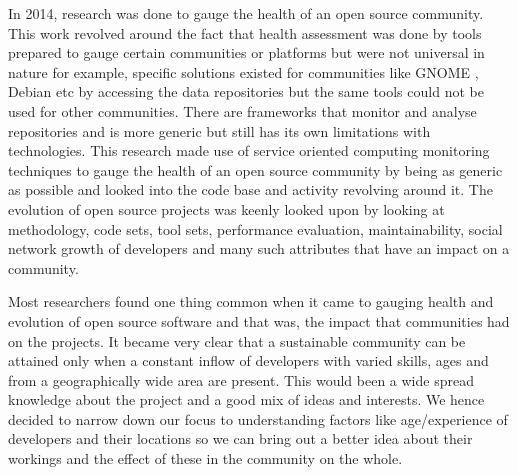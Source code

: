 \documentclass[seploa]{beavtex}
\begin{document}
In 2014, research was done to gauge the health of an open source community. This work revolved around the fact that health assessment was done by tools prepared to gauge certain communities or platforms but were not universal in nature for example, specific solutions existed for communities like GNOME \cite{gno}, Debian\cite{ver2011} etc by accessing the data repositories but the same tools could not be used for other communities\cite{gno}. There are frameworks that monitor and analyse repositories and is more generic but still has its own limitations with technologies\cite{marc2014}. This research made use of service oriented computing monitoring techniques to gauge the health of an open source community by being as generic as possible and looked into the code base and activity revolving around it\cite{marc2014}. The evolution of open source projects was keenly looked upon by looking at methodology, code sets, tool sets, performance evaluation, maintainability, social network growth of developers and many such attributes that have an impact on a community\cite{tarja2013}. 

Most researchers found one thing common when it came to gauging health and evolution of open source software and that was, the impact that communities had on the projects. It became very clear that a sustainable community can be attained only when a constant inflow of developers with varied skills, ages and from a geographically wide area are present. This would been a wide spread knowledge about the project and a good mix of ideas and interests. We hence decided to narrow down our focus to understanding factors like age/experience of developers and their locations so we can bring out a better idea about their workings and the effect of these in the community on the whole.
\end{document}
